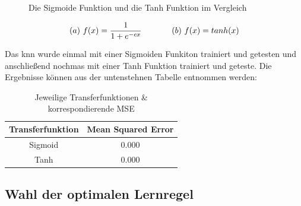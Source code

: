 \begin{figure}[H]
\hfill
{}
\hfill
{}
\hfill
\caption{Die Sigmoide Funktion und die Tanh Funktion im Vergleich}
\end{figure}


\begin{equation}\formelentry{Sigmoide Funktion sowie Tanh Funktion}
(a)\ f(x)= \frac{1}{1+e^{-cx}}\ \ \ \ \ \ \ \ \ \ \ (b)\ f(x)= tanh(x)
\end{equation}

Das \acs{knn} wurde einmal mit einer Sigmoiden Funkiton trainiert und getesten und anschließend nochmas mit einer Tanh Funktion trainiert und geteste. Die Ergebnisse können aus der untenstehnen Tabelle entnommen werden:

\begin{table}[H]
  \centering
  \begin{tabular}{|c|c|}
  \hline 
  \rule[0ex]{0pt}{2.5ex} Transferfunktion & Mean Squared Error \\ 
  \hline 
  \rule[0ex]{0pt}{2.5ex} Sigmoid & 0.000 \\ 
  \hline 
  \rule[0ex]{0pt}{2.5ex} Tanh & 0.000 \\ 
  \hline 
  \end{tabular} 
  \caption{Jeweilige Transferfunktionen \& korrespondierende MSE}
  \label{tab:TRANSMSE}
\end{table}

\subsection{Wahl der optimalen Lernregel} %

